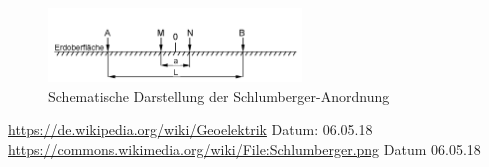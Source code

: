 \documentclass[a4paper,12pt]{scrartcl}
\begin{document}
\begin{figure}[h]
\centering
\includegraphics[width=0.6\textwidth]{Schlumberger.png}
\caption{Schematische Darstellung der Schlumberger-Anordnung}
\label{abb:Schlumberger}
\end{figure}











\newpage
\begin{thebibliography}{999}
 \url{https://de.wikipedia.org/wiki/Geoelektrik} Datum: 06.05.18
 \url{https://commons.wikimedia.org/wiki/File:Schlumberger.png} Datum 06.05.18

\end{thebibliography}
\end{document}
